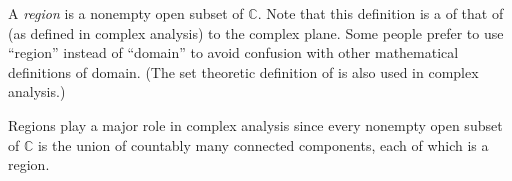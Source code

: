 \documentclass{article}
\begin{document}

A \emph{region} is a nonempty open subset of $\mathbb{C}$.  Note that this definition is a  of that of  (as defined in complex analysis) to the complex plane.  Some people prefer to use ``region'' instead of ``domain'' to avoid confusion with other mathematical definitions of domain.  (The set theoretic definition of  is also used in complex analysis.)

Regions play a major role in complex analysis since every nonempty open subset of $\mathbb{C}$ is the union of countably many connected components, each of which is a region.
\end{document}
